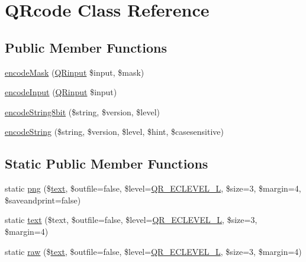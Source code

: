 \hypertarget{class_q_rcode}{\section{Q\-Rcode Class Reference}
\label{class_q_rcode}
}
\subsection*{Public Member Functions}
\begin{DoxyCompactItemize}
\item 
\hyperlink{class_q_rcode_acf42d0cdad5d76be2def212ac6b97d96}{encode\-Mask} (\hyperlink{class_q_rinput}{Q\-Rinput} \$input, \$mask)
\item 
\hyperlink{class_q_rcode_ab5a5a1beab6c2d2e456fe81c7d2c91fd}{encode\-Input} (\hyperlink{class_q_rinput}{Q\-Rinput} \$input)
\item 
\hyperlink{class_q_rcode_ae2c56d379dde08a538d0e8ea41a40249}{encode\-String8bit} (\$string, \$version, \$level)
\item 
\hyperlink{class_q_rcode_ae7268450e652c25d1bdb58f915fe6aee}{encode\-String} (\$string, \$version, \$level, \$hint, \$casesensitive)
\end{DoxyCompactItemize}
\subsection*{Static Public Member Functions}
\begin{DoxyCompactItemize}
\item 
static \hyperlink{class_q_rcode_af1ddbe08ddc863554785e57c0a6b5162}{png} (\$\hyperlink{class_q_rcode_a6d3a6d648171f75856c70d5b7e727d51}{text}, \$outfile=false, \$level=\hyperlink{qrconst_8php_ae106d3baebd9c27c90b2abadb25df012}{Q\-R\-\_\-\-E\-C\-L\-E\-V\-E\-L\-\_\-\-L}, \$size=3, \$margin=4, \$saveandprint=false)
\item 
static \hyperlink{class_q_rcode_a6d3a6d648171f75856c70d5b7e727d51}{text} (\$text, \$outfile=false, \$level=\hyperlink{qrconst_8php_ae106d3baebd9c27c90b2abadb25df012}{Q\-R\-\_\-\-E\-C\-L\-E\-V\-E\-L\-\_\-\-L}, \$size=3, \$margin=4)
\item 
static \hyperlink{class_q_rcode_a87ffd66d8e405c5c98d5e0f3c7a5f914}{raw} (\$\hyperlink{class_q_rcode_a6d3a6d648171f75856c70d5b7e727d51}{text}, \$outfile=false, \$level=\hyperlink{qrconst_8php_ae106d3baebd9c27c90b2abadb25df012}{Q\-R\-\_\-\-E\-C\-L\-E\-V\-E\-L\-\_\-\-L}, \$size=3, \$margin=4)
\end{DoxyCompactItemize}
